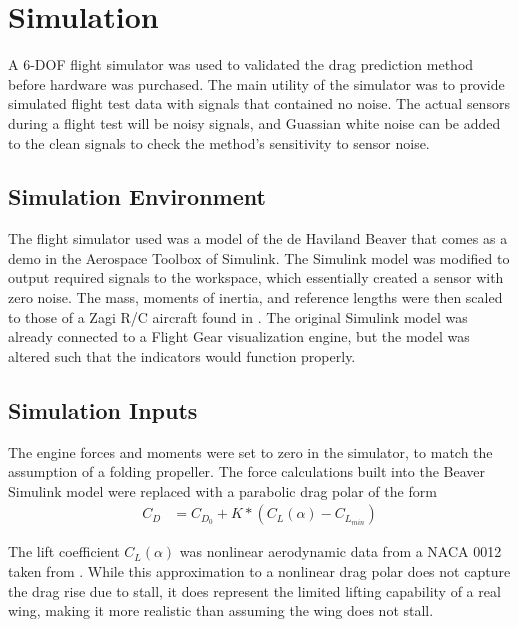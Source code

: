 \chapter{Simulation}
\label{simulation}
A 6-DOF flight simulator was used to validated the drag prediction method before hardware was purchased. The main utility of the simulator was to provide simulated flight test data with signals that contained no noise. The actual sensors during a flight test will be noisy signals, and Guassian white noise can be added to the clean signals to check the method's sensitivity to sensor noise.

\section{Simulation Environment}
The flight simulator used was a model of the de Haviland Beaver that comes as a demo in the Aerospace Toolbox of Simulink. The Simulink model was modified to output required signals to the workspace, which essentially created a sensor with zero noise. The mass, moments of inertia, and reference lengths were then scaled to those of a Zagi R/C aircraft found in \cite{stevens2003aircraft}. The original Simulink model was already connected to a Flight Gear visualization engine, but the model was altered such that the indicators would function properly.

\section{Simulation Inputs}
The engine forces and moments were set to zero in the simulator, to match the assumption of a folding propeller.
The force calculations built into the Beaver Simulink model were replaced with a parabolic drag polar of the form
\begin{align}
C_D &= C_{D_0} + K*(C_L(\alpha)-C_{L_{min}})
\end{align}

The lift coefficient $C_L(\alpha)$ was nonlinear aerodynamic data from a NACA 0012 taken from \cite{osborne2007transitions}. While this approximation to a nonlinear drag polar does not capture the drag rise due to stall, it does represent the limited lifting capability of a real wing, making it more realistic than assuming the wing does not stall.
